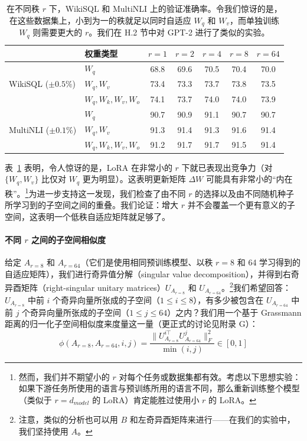\documentclass[11pt,UTF8,fontset=fandol]{ctexart}
\begin{document}
\begin{table}[H]\centering
\caption{在不同秩 $r$ 下，WikiSQL 和 MultiNLI 上的验证准确率。令我们惊讶的是，在这些数据集上，小到为一的秩就足以同时自适应 $W_q$ 和 $W_v$，而单独训练 $W_q$ 则需要更大的 $r$。我们在 H.2 节中对 GPT-2 进行了类似的实验。}
\label{tab:6}
\begin{tabular}{llccccc}
\toprule
 & 权重类型 & $r=1$ & $r=2$ & $r=4$ & $r=8$ & $r=64$ \\
\midrule
\multirow{3}{*}{WikiSQL ($\pm0.5\%$)}
 & $W_q$ & 68.8 & 69.6 & 70.5 & 70.4 & 70.0 \\
 & $W_q, W_v$ & 73.4 & 73.3 & 73.7 & 73.8 & 73.5 \\
 & $W_q, W_k, W_v, W_o$ & 74.1 & 73.7 & 74.0 & 74.0 & 73.9 \\
\midrule
\multirow{3}{*}{MultiNLI ($\pm0.1\%$)}
 & $W_q$ & 90.7 & 90.9 & 91.1 & 90.7 & 90.7 \\
 & $W_q, W_v$ & 91.3 & 91.4 & 91.3 & 91.6 & 91.4 \\
 & $W_q, W_k, W_v, W_o$ & 91.2 & 91.7 & 91.7 & 91.5 & 91.4 \\
\bottomrule
\end{tabular}
\end{table}

表~\ref{tab:6} 表明，令人惊讶的是，LoRA 在非常小的 $r$ 下就已表现出竞争力（对 $\{W_q, W_v\}$ 比仅对 $W_q$ 更为明显）。这表明更新矩阵 $\Delta W$ 可能具有非常小的“内在秩”。\footnote{然而，我们并不期望小的 $r$ 对每个任务或数据集都有效。考虑以下思想实验：如果下游任务所使用的语言与预训练所用的语言不同，那么重新训练整个模型（类似于 $r=d_{model}$ 的 LoRA）肯定能胜过使用小 $r$ 的 LoRA。}为进一步支持这一发现，我们检查了由不同 $r$ 的选择以及由不同随机种子所学习到的子空间之间的重叠。我们论证：增大 $r$ 并不会覆盖一个更有意义的子空间，这表明一个低秩自适应矩阵就足够了。

\paragraph{不同 $r$ 之间的子空间相似度}给定 $A_{r=8}$ 和 $A_{r=64}$（它们是使用相同预训练模型、以秩 $r=8$ 和 64 学习得到的自适应矩阵），我们进行奇异值分解（singular value decomposition），并得到右奇异酉矩阵（right-singular unitary matrices）$U_{A_{r=8}}$ 和 $U_{A_{r=64}}$。\footnote{注意，类似的分析也可以用 $B$ 和左奇异酉矩阵来进行——在我们的实验中，我们坚持使用 $A$。}我们希望回答：$U_{A_{r=8}}$ 中前 $i$ 个奇异向量所张成的子空间（$1\le i\le 8$），有多少被包含在 $U_{A_{r=64}}$ 中前 $j$ 个奇异向量所张成的子空间（$1\le j\le 64$）之内？我们用一个基于 Grassmann 距离的归一化子空间相似度来度量这一量（更正式的讨论见附录 G）：
\begin{equation}
\phi(A_{r=8}, A_{r=64}, i, j)=\frac{\|U_{A_{r=8}}^{i\top}U_{A_{r=64}}^{j}\|_F^2}{\min(i,j)}\in[0,1]\tag{4}
\end{equation}
\end{document}

